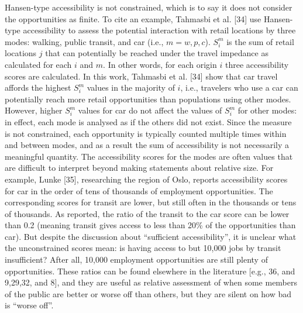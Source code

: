\documentclass[10pt,letterpaper]{article}
\begin{document}
Hansen-type accessibility is not constrained, which is to say it does
not consider the opportunities as finite. To cite an example, Tahmasbi
et al. {[}34{]} use Hansen-type accessibility to assess the potential
interaction with retail locations by three modes: walking, public
transit, and car (i.e., \(m = w, p, c\)). \(S_i^m\) is the sum of retail
locations \(j\) that can potentially be reached under the travel
impedance as calculated for each \(i\) and \(m\). In other words, for
each origin \(i\) three accessibility scores are calculated. In this
work, Tahmasbi et al. {[}34{]} show that car travel affords the highest
\(S_i^{m}\) values in the majority of \(i\), i.e., travelers who use a
car can potentially reach more retail opportunities than populations
using other modes. However, higher \(S_i^{m}\) values for car do not
affect the values of \(S_i^{m}\) for other modes: in effect, each mode
is analysed as if the others did not exist. Since the measure is not
constrained, each opportunity is typically counted multiple times within
and between modes, and as a result the sum of accessibility is not
necessarily a meaningful quantity. The accessibility scores for the
modes are often values that are difficult to interpret beyond making
statements about relative size. For example, Lunke {[}35{]}, researching
the region of Oslo, reports accessibility scores for car in the order of
tens of thousands of employment opportunities. The corresponding scores
for transit are lower, but still often in the thousands or tens of
thousands. As reported, the ratio of the transit to the car score can be
lower than 0.2 (meaning transit gives access to less than 20\% of the
opportunities than car). But despite the discussion about ``sufficient
accessibility'', it is unclear what the unconstrained scores mean: is
having access to but 10,000 jobs by transit insufficient? After all,
10,000 employment opportunities are still plenty of opportunities. These
ratios can be found elsewhere in the literature {[}e.g., 36, and
9,29,32, and 8{]}, and they are useful as relative assessment of when
some members of the public are better or worse off than others, but they
are silent on how bad is ``worse off''.
\end{document}
